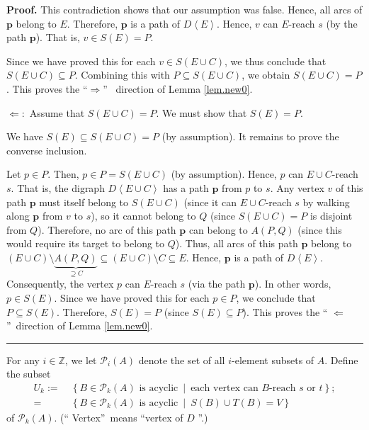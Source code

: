 \documentclass[numbers=enddot,12pt,final,onecolumn,notitlepage]{scrartcl}%
\theoremstyle{definition}
\newenvironment{proof}[1][Proof]{\noindent\textbf{#1.} }{\ \rule{0.5em}{0.5em}}
\theoremstyle{plainsl}
\begin{document}
\begin{proof}
This contradiction shows that our assumption was false. Hence, all arcs of
$\mathbf{p}$ belong to $E$. Therefore, $\mathbf{p}$ is a path of
$D\left\langle E\right\rangle $. Hence, $v$ can $E$-reach $s$ (by the path
$\mathbf{p}$). That is, $v\in S\left(  E\right)  =P$.

Since we have proved this for each $v\in S\left(  E\cup C\right)  $, we thus
conclude that $S\left(  E\cup C\right)  \subseteq P$. Combining this with
$P\subseteq S\left(  E\cup C\right)  $, we obtain $S\left(  E\cup C\right)
=P$. This proves the \textquotedblleft$\Longrightarrow$\textquotedblright%
\ direction of Lemma \ref{lem.new0}. \medskip

$\Longleftarrow:$ Assume that $S\left(  E\cup C\right)  =P$. We must show that
$S\left(  E\right)  =P$.

We have $S\left(  E\right)  \subseteq S\left(  E\cup C\right)  =P$ (by
assumption). It remains to prove the converse inclusion.

Let $p\in P$. Then, $p\in P=S\left(  E\cup C\right)  $ (by assumption). Hence,
$p$ can $E\cup C$-reach $s$. That is, the digraph $D\left\langle E\cup
C\right\rangle $ has a path $\mathbf{p}$ from $p$ to $s$. Any vertex $v$ of
this path $\mathbf{p}$ must itself belong to $S\left(  E\cup C\right)  $
(since it can $E\cup C$-reach $s$ by walking along $\mathbf{p}$ from $v$ to
$s$), so it cannot belong to $Q$ (since $S\left(  E\cup C\right)  =P$ is
disjoint from $Q$). Therefore, no arc of this path $\mathbf{p}$ can belong to
$A\left(  P,Q\right)  $ (since this would require its target to belong to
$Q$). Thus, all arcs of this path $\mathbf{p}$ belong to $\left(  E\cup
C\right)  \setminus\underbrace{A\left(  P,Q\right)  }_{\supseteq C}%
\subseteq\left(  E\cup C\right)  \setminus C\subseteq E$. Hence, $\mathbf{p}$
is a path of $D\left\langle E\right\rangle $. Consequently, the vertex $p$ can
$E$-reach $s$ (via the path $\mathbf{p}$). In other words, $p\in S\left(
E\right)  $. Since we have proved this for each $p\in P$, we conclude that
$P\subseteq S\left(  E\right)  $. Therefore, $S\left(  E\right)  =P$ (since
$S\left(  E\right)  \subseteq P$). This proves the \textquotedblleft%
$\Longleftarrow$\textquotedblright\ direction of Lemma \ref{lem.new0}.
\end{proof}

For any $i\in\mathbb{Z}$, we let $\mathcal{P}_{i}\left(  A\right)  $ denote
the set of all $i$-element subsets of $A$. Define the subset%
\begin{align*}
U_{k}:=  &  \ \left\{  B\in\mathcal{P}_{k}\left(  A\right)  \text{ is
acyclic}\ \mid\ \text{each vertex can }B\text{-reach }s\text{ or }t\right\}
;\\
=  &  \ \left\{  B\in\mathcal{P}_{k}\left(  A\right)  \text{ is acyclic}%
\ \mid\ S\left(  B\right)  \cup T\left(  B\right)  =V\right\}
\end{align*}
of $\mathcal{P}_{k}\left(  A\right)  $. (\textquotedblleft
Vertex\textquotedblright\ means \textquotedblleft vertex of $D$%
\textquotedblright.)
\end{document}
